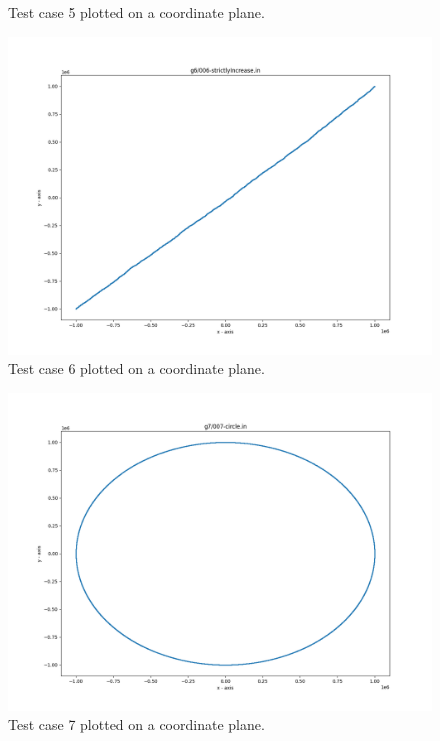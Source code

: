 \documentclass{article}
\begin{document}
\begin{appendices}
\begin{figure}[H]
	\caption{Test case 5 plotted on a coordinate plane.}
	\label{fig:05}
\end{figure}
\begin{figure}[H]
	\centering
	\includegraphics[scale=0.5]{code/visualizer/testdata/06.png}
	\caption{Test case 6 plotted on a coordinate plane.}
	\label{fig:06}
\end{figure}
\begin{figure}[H]
	\centering
	\includegraphics[scale=0.5]{code/visualizer/testdata/07.png}
	\caption{Test case 7 plotted on a coordinate plane.}
	\label{fig:07}
\end{figure}
\begin{figure}[H]
	\centering

\end{figure}
\end{appendices}
\end{document}
